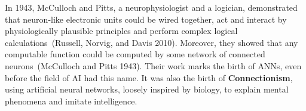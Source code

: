 \documentclass[
  letterpaper,
  12pt,
  british]{tufte-book}
\theoremstyle{plain}
\theoremstyle{plain}
\theoremstyle{definition}
\theoremstyle{remark}
\begin{document}
In 1943, McCulloch and Pitts, a neurophysiologist and a logician,
demonstrated that neuron-like electronic units could be wired together,
act and interact by physiologically plausible principles and perform
complex logical calculations~(Russell, Norvig, and Davis
2010).
Moreover, they showed that any computable function could be computed by
some network of connected neurons~(McCulloch and Pitts
1943).
Their work marks the birth of {ANNs}, even before the field of AI had
this name. It was also the birth of \textbf{Connectionism}, using
artificial neural networks, loosely inspired by biology, to explain
mental phenomena and imitate intelligence.
\end{document}
